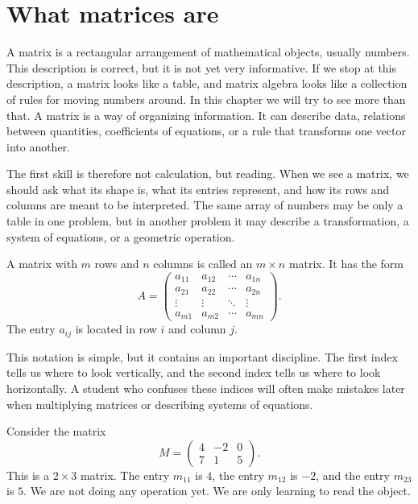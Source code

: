 \section{What matrices are}

A matrix is a rectangular arrangement of mathematical objects, usually numbers. This description is correct, but it is not yet very informative. If we stop at this description, a matrix looks like a table, and matrix algebra looks like a collection of rules for moving numbers around. In this chapter we will try to see more than that. A matrix is a way of organizing information. It can describe data, relations between quantities, coefficients of equations, or a rule that transforms one vector into another.

The first skill is therefore not calculation, but reading. When we see a matrix, we should ask what its shape is, what its entries represent, and how its rows and columns are meant to be interpreted. The same array of numbers may be only a table in one problem, but in another problem it may describe a transformation, a system of equations, or a geometric operation.

\begin{definitionbox}
A matrix with \(m\) rows and \(n\) columns is called an \(m\times n\) matrix. It has the form
\[
A=
\begin{pmatrix}
a_{11} & a_{12} & \cdots & a_{1n}\\
a_{21} & a_{22} & \cdots & a_{2n}\\
\vdots & \vdots & \ddots & \vdots\\
a_{m1} & a_{m2} & \cdots & a_{mn}
\end{pmatrix}.
\]
The entry \(a_{ij}\) is located in row \(i\) and column \(j\).
\end{definitionbox}

This notation is simple, but it contains an important discipline. The first index tells us where to look vertically, and the second index tells us where to look horizontally. A student who confuses these indices will often make mistakes later when multiplying matrices or describing systems of equations.

\begin{examplebox}
Consider the matrix
\[
M=
\begin{pmatrix}
4 & -2 & 0\\
7 & 1 & 5
\end{pmatrix}.
\]
This is a \(2\times 3\) matrix. The entry \(m_{11}\) is \(4\), the entry \(m_{12}\) is \(-2\), and the entry \(m_{23}\) is \(5\). We are not doing any operation yet. We are only learning to read the object.
\end{examplebox}

